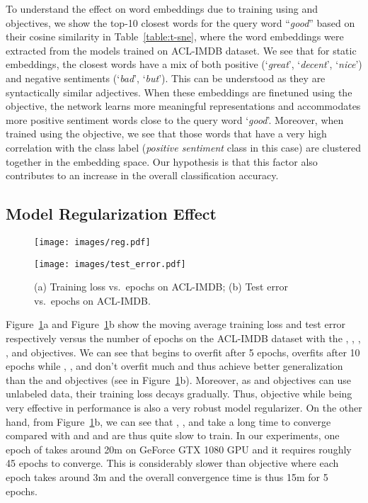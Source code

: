 \documentclass[letterpaper]{article}
\begin{document}
To understand the effect on word embeddings due to training using  and  objectives, we show the top-10 closest words for the query word ``\emph{good}'' based on their cosine similarity in Table~\ref{table:t-sne}, where the word embeddings were extracted from the models trained on ACL-IMDB dataset. We see that for static embeddings, the closest words have a mix of both positive (`\emph{great}', `\emph{decent}', `\emph{nice}') and negative sentiments (`\emph{bad}', `\emph{but}'). This can be understood as they are syntactically similar adjectives. When these embeddings are finetuned using the  objective, the network learns more meaningful representations and accommodates more positive sentiment words close to the query word `\emph{good}'. Moreover, when trained using the  objective, we see that those words that have a very high correlation with the class label (\emph{positive sentiment} class in this case) are clustered together in the embedding space. Our hypothesis is that this factor also contributes to an increase in the overall classification accuracy.

\subsection{Model Regularization Effect}
\begin{figure}[!htp]
\begin{minipage}{0.5\linewidth}
\centering
\texttt{[image: images/reg.pdf]}
\end{minipage}\begin{minipage}{0.5\linewidth}
\centering
\texttt{[image: images/test\_error.pdf]}
\end{minipage}
\caption{(a) Training loss vs.\ epochs on ACL-IMDB; (b) Test error vs.\ epochs on ACL-IMDB.}
\label{fig:reg}
\end{figure}

Figure~\ref{fig:reg}a and Figure~\ref{fig:reg}b show the moving average training loss and test error respectively versus the number of epochs on the ACL-IMDB dataset with the , , , , and  objectives. We can see
 that  begins to overfit after 5 epochs,  overfits after 10 epochs while , , and  don't overfit much and thus achieve better generalization than the  and  objectives (see in Figure~\ref{fig:reg}b). Moreover, as  and  objectives can use unlabeled data, their training loss decays gradually.
Thus,  objective while being very effective in performance is also a very robust model regularizer. On the other hand, from Figure~\ref{fig:reg}b, we can see that , , and  take a long time to converge compared with  and  and are thus quite slow to train. In our experiments, one epoch of  takes around 20m on GeForce GTX 1080 GPU and it requires roughly 45 epochs to converge. This is considerably slower than  objective where each epoch takes around 3m and the overall convergence time is thus 15m for 5 epochs.
\end{document}
